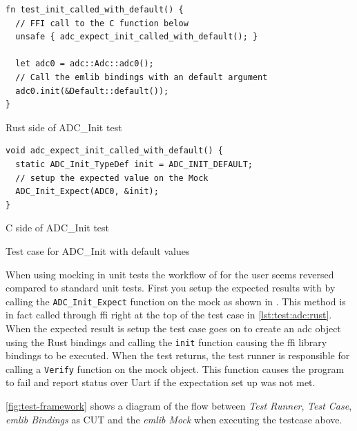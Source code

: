 \begin{listing}[H]
  \centering
  \begin{minipage}{\textwidth}
  \begin{listing}
    \begin{verbatim}
fn test_init_called_with_default() {
  // FFI call to the C function below
  unsafe { adc_expect_init_called_with_default(); }

  let adc0 = adc::Adc::adc0();
  // Call the emlib bindings with an default argument
  adc0.init(&Default::default());
}
    \end{verbatim}
    \label{lst:test:adc:rust}
    \caption{Rust side of ADC\_Init test}
  \end{listing}
  \end{minipage}

  \begin{minipage}{\textwidth}
  \begin{listing}
    \begin{verbatim}
void adc_expect_init_called_with_default() {
  static ADC_Init_TypeDef init = ADC_INIT_DEFAULT;
  // setup the expected value on the Mock
  ADC_Init_Expect(ADC0, &init);
}
    \end{verbatim}
    \label{lst:test:adc:c}
    \caption{C side of ADC\_Init test}
  \end{listing}
  \end{minipage}

  \caption{Test case for ADC\_Init with default values}
  \label{lst:test:adc}
\end{listing}

When using mocking in unit tests the workflow of for the user seems reversed compared to standard unit tests.
First you setup the expected results with by calling the \texttt{ADC\_Init\_Expect} function on the mock as shown in .
This method is in fact called through \gls{ffi} right at the top of the test case in \autoref{lst:test:adc:rust}.
When the expected result is setup the test case goes on to create an \gls{adc} object using the Rust bindings and calling the \texttt{init} function causing the \gls{ffi} library bindings to be executed.
When the test returns, the test runner is responsible for calling a \texttt{Verify} function on the mock object.
This function causes the program to fail and report status over Uart if the expectation set up was not met.

\autoref{fig:test-framework} shows a diagram of the flow between \textit{Test Runner}, \textit{Test Case}, \textit{emlib Bindings} as \gls{CUT} and the \textit{emlib Mock} when executing the testcase above.

